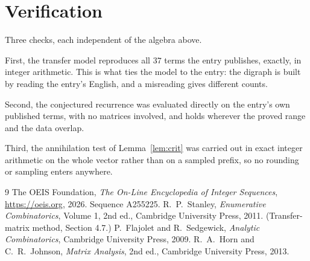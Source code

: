 \documentclass[11pt,a4paper]{article}
\theoremstyle{plain}
\theoremstyle{definition}
\begin{document}
\section{Verification}

Three checks, each independent of the algebra above.

First, the transfer model reproduces all $37$ terms the entry publishes, exactly, in
integer arithmetic. This is what ties the model to the entry: the digraph is built by reading
the entry's English, and a misreading gives different counts.

Second, the conjectured recurrence was evaluated directly on the entry's own published terms,
with no matrices involved, and holds wherever the proved range and the data overlap.

Third, the annihilation test of Lemma~\ref{lem:crit} was carried out in exact integer
arithmetic on the whole vector rather than on a sampled prefix, so no rounding or sampling
enters anywhere.

\begin{thebibliography}{9}
 The OEIS Foundation, \emph{The On-Line Encyclopedia of Integer
Sequences}, \url{https://oeis.org}, 2026. Sequence A255225.
 R.~P.~Stanley, \emph{Enumerative Combinatorics}, Volume 1, 2nd ed.,
Cambridge University Press, 2011. (Transfer-matrix method, Section 4.7.)
 P.~Flajolet and R.~Sedgewick, \emph{Analytic Combinatorics}, Cambridge
University Press, 2009.
 R.~A.~Horn and C.~R.~Johnson, \emph{Matrix Analysis}, 2nd ed., Cambridge
University Press, 2013.
\end{thebibliography}
\end{document}
